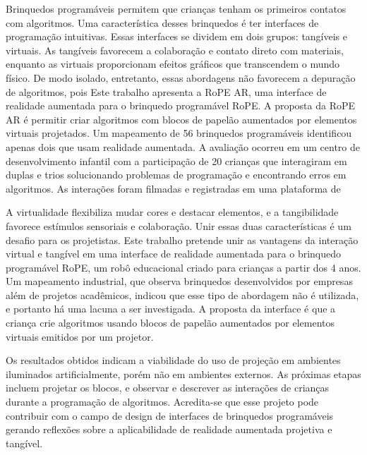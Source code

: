 \setlength{\absparsep}{14pt} 
\begin{resumo}

Brinquedos programáveis permitem que crianças tenham os primeiros contatos com algoritmos. Uma característica desses brinquedos é ter interfaces de programação intuitivas. Essas interfaces se dividem em dois grupos: tangíveis e virtuais. As tangíveis favorecem a colaboração e contato direto com materiais, enquanto as virtuais proporcionam efeitos gráficos que transcendem o mundo físico. De modo isolado, entretanto, essas abordagens não favorecem a depuração de algoritmos, pois
Este trabalho apresenta a RoPE AR, uma interface de realidade aumentada para o brinquedo programável RoPE. A proposta da RoPE AR é permitir criar algoritmos com blocos de papelão aumentados por elementos virtuais projetados. Um mapeamento de 56 brinquedos programáveis identificou apenas dois que usam realidade aumentada.  A avaliação ocorreu em um centro de desenvolvimento infantil com a participação de 20 crianças que interagiram em duplas e trios solucionando problemas de programação e encontrando erros em algoritmos. As interações foram filmadas e registradas em uma plataforma de 

A virtualidade flexibiliza mudar cores e destacar elementos, e a tangibilidade favorece estímulos sensoriais e colaboração. Unir essas duas características é um desafio para os projetistas.
Este trabalho pretende unir as vantagens da interação virtual e tangível em uma interface de realidade aumentada para o brinquedo programável RoPE, um robô educacional criado para crianças a partir dos 4 anos. Um mapeamento industrial, que observa brinquedos desenvolvidos por empresas além de projetos acadêmicos, indicou que esse tipo de abordagem não é utilizada, e portanto há uma lacuna a ser investigada. A proposta da interface é que a criança crie algoritmos usando blocos de papelão aumentados por elementos virtuais emitidos por um projetor.

Os resultados obtidos indicam a viabilidade do uso de projeção em ambientes iluminados artificialmente, porém não em ambientes externos. As próximas etapas incluem projetar os blocos, e observar e descrever as interações de crianças durante a programação de algoritmos. Acredita-se que esse projeto pode contribuir com o campo de design de interfaces de brinquedos programáveis gerando reflexões sobre a aplicabilidade de realidade aumentada projetiva e tangível.


\end{resumo}
